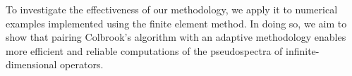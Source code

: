 To investigate the effectiveness of our methodology, we apply it to numerical examples implemented using the finite element method. In doing so, we aim to show that pairing Colbrook's algorithm with an adaptive methodology enables more efficient and reliable computations of the pseudospectra of infinite-dimensional operators.








